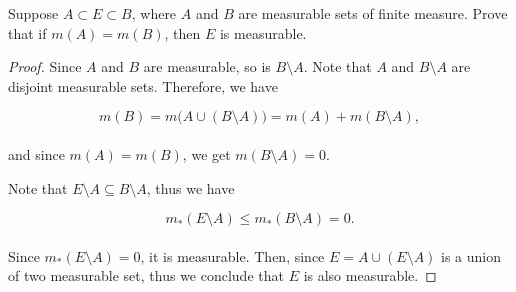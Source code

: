\documentclass[12pt, a4paper, openany, twoside]{book}
\theoremstyle{definition}
\theoremstyle{remark}
\theoremstyle{plain}
\numberwithin{equation}{section}
\begin{document}
\newpage

\begin{tcolorbox}[colback=yellow!10!white,colframe=gray!75!black,title=Exercise 1.26]\label{Exercise 1.26}
    Suppose $A\subset E\subset B$, where $A$ and $B$ are measurable sets of finite measure. Prove that if $m(A)=m(B)$, then $E$ is measurable.
\end{tcolorbox}
\begin{proof}
    Since $A$ and $B$ are measurable, so is $B\setminus A$. Note that $A$ and $B\setminus A$ are disjoint measurable sets. Therefore, we have

    \[m(B)=m\big(A\cup(B\setminus A)\big)=m(A)+m(B\setminus A),\]
    \\
    and since $m(A)=m(B)$, we get $m(B\setminus A)=0$. 

    Note that $E\setminus A\subseteq B\setminus A$, thus we have

    \[m_*(E\setminus A)\leq m_*(B\setminus A)=0.\]
    \\
    Since $m_*(E\setminus A)=0$, it is measurable. Then, since $E=A\cup (E\setminus A)$ is a union of two measurable set, thus we conclude that $E$ is also measurable.
\end{proof}

\newpage
\end{document}
